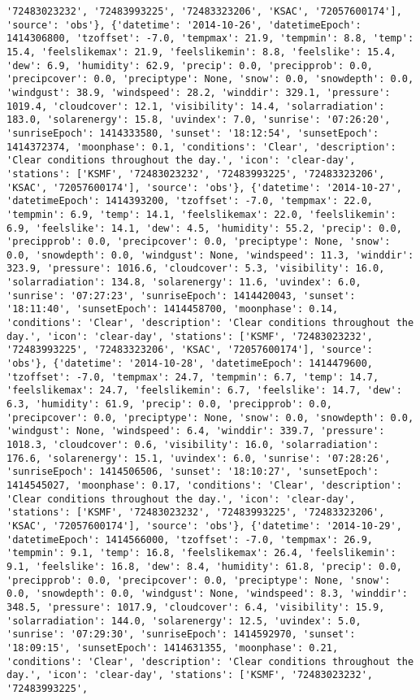 \documentclass[
  letterpaper,
  DIV=11,
  numbers=noendperiod]{scrartcl}
\begin{document}
\begin{verbatim}
'72483023232', '72483993225', '72483323206', 'KSAC', '72057600174'], 'source': 'obs'}, {'datetime': '2014-10-26', 'datetimeEpoch': 1414306800, 'tzoffset': -7.0, 'tempmax': 21.9, 'tempmin': 8.8, 'temp': 15.4, 'feelslikemax': 21.9, 'feelslikemin': 8.8, 'feelslike': 15.4, 'dew': 6.9, 'humidity': 62.9, 'precip': 0.0, 'precipprob': 0.0, 'precipcover': 0.0, 'preciptype': None, 'snow': 0.0, 'snowdepth': 0.0, 'windgust': 38.9, 'windspeed': 28.2, 'winddir': 329.1, 'pressure': 1019.4, 'cloudcover': 12.1, 'visibility': 14.4, 'solarradiation': 183.0, 'solarenergy': 15.8, 'uvindex': 7.0, 'sunrise': '07:26:20', 'sunriseEpoch': 1414333580, 'sunset': '18:12:54', 'sunsetEpoch': 1414372374, 'moonphase': 0.1, 'conditions': 'Clear', 'description': 'Clear conditions throughout the day.', 'icon': 'clear-day', 'stations': ['KSMF', '72483023232', '72483993225', '72483323206', 'KSAC', '72057600174'], 'source': 'obs'}, {'datetime': '2014-10-27', 'datetimeEpoch': 1414393200, 'tzoffset': -7.0, 'tempmax': 22.0, 'tempmin': 6.9, 'temp': 14.1, 'feelslikemax': 22.0, 'feelslikemin': 6.9, 'feelslike': 14.1, 'dew': 4.5, 'humidity': 55.2, 'precip': 0.0, 'precipprob': 0.0, 'precipcover': 0.0, 'preciptype': None, 'snow': 0.0, 'snowdepth': 0.0, 'windgust': None, 'windspeed': 11.3, 'winddir': 323.9, 'pressure': 1016.6, 'cloudcover': 5.3, 'visibility': 16.0, 'solarradiation': 134.8, 'solarenergy': 11.6, 'uvindex': 6.0, 'sunrise': '07:27:23', 'sunriseEpoch': 1414420043, 'sunset': '18:11:40', 'sunsetEpoch': 1414458700, 'moonphase': 0.14, 'conditions': 'Clear', 'description': 'Clear conditions throughout the day.', 'icon': 'clear-day', 'stations': ['KSMF', '72483023232', '72483993225', '72483323206', 'KSAC', '72057600174'], 'source': 'obs'}, {'datetime': '2014-10-28', 'datetimeEpoch': 1414479600, 'tzoffset': -7.0, 'tempmax': 24.7, 'tempmin': 6.7, 'temp': 14.7, 'feelslikemax': 24.7, 'feelslikemin': 6.7, 'feelslike': 14.7, 'dew': 6.3, 'humidity': 61.9, 'precip': 0.0, 'precipprob': 0.0, 'precipcover': 0.0, 'preciptype': None, 'snow': 0.0, 'snowdepth': 0.0, 'windgust': None, 'windspeed': 6.4, 'winddir': 339.7, 'pressure': 1018.3, 'cloudcover': 0.6, 'visibility': 16.0, 'solarradiation': 176.6, 'solarenergy': 15.1, 'uvindex': 6.0, 'sunrise': '07:28:26', 'sunriseEpoch': 1414506506, 'sunset': '18:10:27', 'sunsetEpoch': 1414545027, 'moonphase': 0.17, 'conditions': 'Clear', 'description': 'Clear conditions throughout the day.', 'icon': 'clear-day', 'stations': ['KSMF', '72483023232', '72483993225', '72483323206', 'KSAC', '72057600174'], 'source': 'obs'}, {'datetime': '2014-10-29', 'datetimeEpoch': 1414566000, 'tzoffset': -7.0, 'tempmax': 26.9, 'tempmin': 9.1, 'temp': 16.8, 'feelslikemax': 26.4, 'feelslikemin': 9.1, 'feelslike': 16.8, 'dew': 8.4, 'humidity': 61.8, 'precip': 0.0, 'precipprob': 0.0, 'precipcover': 0.0, 'preciptype': None, 'snow': 0.0, 'snowdepth': 0.0, 'windgust': None, 'windspeed': 8.3, 'winddir': 348.5, 'pressure': 1017.9, 'cloudcover': 6.4, 'visibility': 15.9, 'solarradiation': 144.0, 'solarenergy': 12.5, 'uvindex': 5.0, 'sunrise': '07:29:30', 'sunriseEpoch': 1414592970, 'sunset': '18:09:15', 'sunsetEpoch': 1414631355, 'moonphase': 0.21, 'conditions': 'Clear', 'description': 'Clear conditions throughout the day.', 'icon': 'clear-day', 'stations': ['KSMF', '72483023232', '72483993225', 
\end{verbatim}
\end{document}
